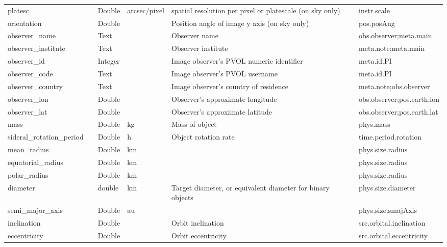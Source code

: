 \documentclass[11pt,a4paper]{ivoa}
\begin{document}
\begin{longtable}{p{3.5cm}p{0.5cm}p{1cm}p{1cm}p{7cm}p{3cm}}
platesc&&Double&arcsec/pixel&spatial resolution per pixel or platescale (on sky only)&instr.scale\\

orientation&&Double&&Position angle of image y axis (on sky only)&pos.posAng\\

observer\_name&&Text&&Observer name&obs.observer;meta.main\\

observer\_institute&&Text&&Observer institute&meta.note;meta.main\\

observer\_id&&Integer&&Image observer's PVOL numeric identifier&meta.id.PI\\

observer\_code&&Text&&Image observer's PVOL username&meta.id.PI\\

observer\_country&&Text&&Image observer's country of residence&meta.note;obs.observer\\

observer\_lon&&Double&&Observer's approximate longitude&obs.observer;pos.earth.lon\\

observer\_lat&&Double&&Observer's approximate latitude&obs.observer;pos.earth.lat\\

mass&&Double&kg&Mass of object&phys.mass\\

sideral\_rotation\_period&&Double&h&Object rotation rate&time.period.rotation\\

mean\_radius&&Double&km&&phys.size.radius\\

equatorial\_radius&&Double&km&&phys.size.radius\\

polar\_radius&&Double&km&&phys.size.radius\\

diameter&&double&km&Target diameter, or equivalent diameter for binary objects&phys.size.diameter\\

semi\_major\_axis&&Double&au&&phys.size.smajAxis\\

inclination&&Double&&Orbit inclination&src.orbital.inclination\\

eccentricity&&Double&&Orbit eccentricity&src.orbital.eccentricity\\


\end{longtable}
\end{document}
